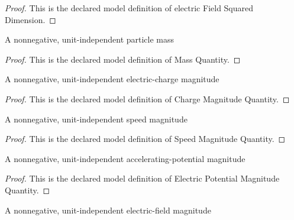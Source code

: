 \begin{proof}
  This is the declared model definition of electric Field Squared Dimension.
\end{proof}
\begin{definition}
  \label{def:physics:phyx-mini-0955:phyxminiproblems-problemphyxmini0955-massquantity}
  A nonnegative, unit-independent particle mass
\end{definition}
\begin{proof}
  This is the declared model definition of Mass Quantity.
\end{proof}
\begin{definition}
  \label{def:physics:phyx-mini-0955:phyxminiproblems-problemphyxmini0955-chargemagnitudequantity}
  A nonnegative, unit-independent electric-charge magnitude
\end{definition}
\begin{proof}
  This is the declared model definition of Charge Magnitude Quantity.
\end{proof}
\begin{definition}
  \label{def:physics:phyx-mini-0955:phyxminiproblems-problemphyxmini0955-speedmagnitudequantity}
  A nonnegative, unit-independent speed magnitude
\end{definition}
\begin{proof}
  This is the declared model definition of Speed Magnitude Quantity.
\end{proof}
\begin{definition}
  \label{def:physics:phyx-mini-0955:phyxminiproblems-problemphyxmini0955-electricpotentialmagnitudequantity}
  A nonnegative, unit-independent accelerating-potential magnitude
\end{definition}
\begin{proof}
  This is the declared model definition of Electric Potential Magnitude Quantity.
\end{proof}
\begin{definition}
  \label{def:physics:phyx-mini-0955:phyxminiproblems-problemphyxmini0955-electricfieldmagnitudequantity}
  A nonnegative, unit-independent electric-field magnitude
\end{definition}
